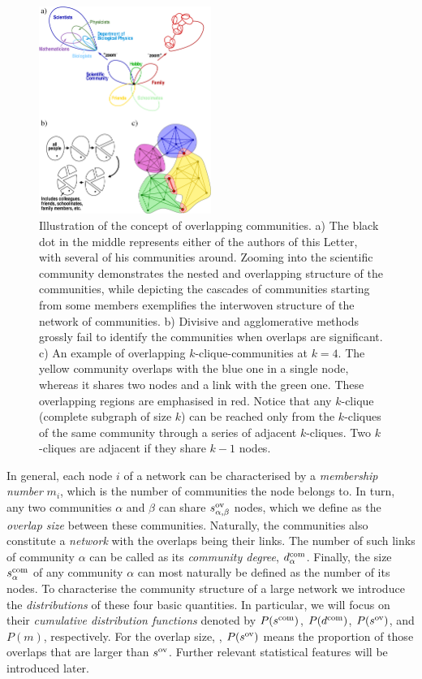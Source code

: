 \documentclass[11pt,a4paper]{article}
\begin{document}
\begin{figure}[!t]
\centerline{\includegraphics[width=0.5\textwidth]{vegso/commun_szeml_ov}}
\caption{
Illustration of the concept of overlapping communities.
a) The black dot in the middle represents either of the authors of this
Letter, with several of his communities around. Zooming into the
scientific community demonstrates the nested and overlapping structure
of the communities, while depicting the cascades of communities
starting from some members exemplifies the interwoven structure
of the network of communities.
%
b)
Divisive and agglomerative methods
grossly fail to identify
the communities when overlaps are significant.
%
c) An example of overlapping $k$-clique-communities at $k=4$. The
yellow community overlaps with the blue one in a single node, whereas
it shares two nodes and a link with the green one. These overlapping
regions are emphasised in red. Notice that any $k$-clique (complete
subgraph of size $k$) can be reached only from the $k$-cliques of the
same community through a series of adjacent $k$-cliques. Two
$k$-cliques are adjacent if they share $k-1$ nodes.
}
\label{fig:szeml}
\end{figure}

In general, each node $i$ of a network can be characterised by a
\emph{membership number} $m_i$, which is the number of communities the
node belongs to. In turn, any two communities $\alpha$ and $\beta$
can share $s^{\rm ov}_{\alpha,\beta}$ nodes, which we define as the
\emph{overlap size} between these communities. Naturally, the
communities also constitute a \emph{network}
with the overlaps being their links.
The number of such links of community $\alpha$
can be called as
its \emph{community degree}, $d^{\rm com}_{\alpha}$.
Finally, the size $s^{\rm com}_\alpha$ of any community $\alpha$ can most
naturally be defined as the number of its nodes.
To characterise the community structure of a large network we introduce
the \emph{distributions} of these four basic quantities. In
particular, we will focus on their \emph{cumulative distribution
functions} denoted by
$P(s^{\rm com})$, $P(d^{\rm com})$, $P(s^{\rm ov})$, and $P(m)$, respectively.
For the overlap size, \eg, $P(s^{\rm ov})$ means the proportion of
those overlaps that are larger than $s^{\rm ov}$.
Further relevant statistical features will be introduced later.
\end{document}

